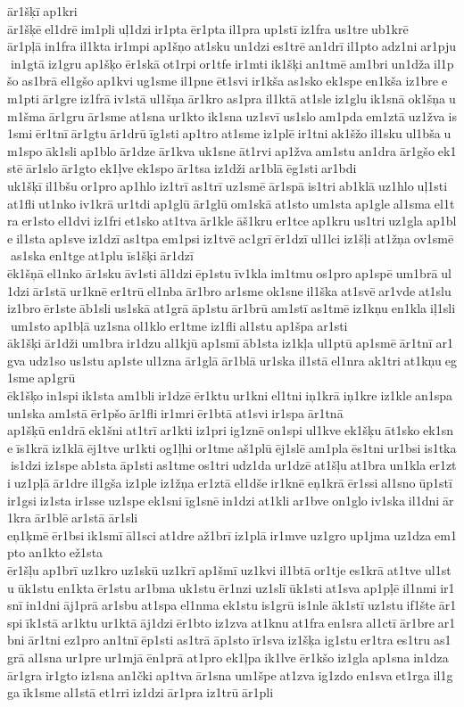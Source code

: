 ār1šķī ap1kri 
ār1šķē el1drē im1pli uļ1dzi ir1pta ēr1pta il1pra up1stī iz1fra us1tre ub1krē 	ār1pļā in1fra il1kta ir1mpi ap1šņo at1sku un1dzi es1trē an1drī il1pto adz1ni ar1pju in1gtā iz1gru ap1šķo ēr1skā ot1rpi or1tfe ir1mti ik1šķi an1tmē am1bri un1dža il1pšo as1brā el1gšo ap1kvi ug1sme il1pne ēt1svi ir1kša as1sko ek1spe en1kša iz1bre em1pti ār1gre iz1frā iv1stā ul1šņa ār1kro as1pra il1ktā at1sle iz1glu ik1snā ok1šņa um1šma ār1gru ār1sme at1sna ur1kto ik1sna uz1svī us1slo am1pda em1ztā uz1žva is1smi ēr1tnī ār1gtu ār1drū īg1sti ap1tro at1sme iz1plē ir1tni ak1šžo il1sku ul1bša um1spo āk1sli ap1blo ār1dze ār1kva uk1sne āt1rvi ap1žva am1stu an1dra ār1gšo ek1stē ār1slo ār1gto ek1ļve ek1spo ār1tsa iz1dži ar1blā ēg1sti ar1bdi 	uk1šķī il1bšu or1pro ap1hlo iz1trī as1trī uz1smē ār1spā is1tri ab1klā uz1hlo uļ1sti at1fli ut1nko iv1krā ur1tdi ap1glū ār1glū om1skā at1sto um1sta ap1gle al1sma el1tra er1sto el1dvi iz1fri et1sko at1tva ār1kle āš1kru er1tce ap1kru us1tri uz1gla ap1ble il1sta ap1sve iz1dzī as1tpa em1psi iz1tvē ac1grī ēr1dzī ul1lci iz1šļi at1žņa ov1smē as1ska en1tge at1plu 	īs1šķi ār1dzī 
ēk1šņā el1nko ār1sku āv1sti āl1dzi ēp1stu īv1kla im1tmu os1pro ap1spē um1brā ul1dzi ār1stā ur1knē er1trū el1nba ār1bro ar1sme ok1sne il1ška at1svē ar1vde at1slu iz1bro ēr1ste āb1sli us1skā at1grā āp1stu ār1brū am1stī as1tmē iz1kņu en1kla iļ1sli um1sto ap1bļā uz1sna ol1klo er1tme iz1fli al1stu ap1špa ar1sti 	āk1šķi ār1dži um1bra ir1dzu al1kjū ap1smī āb1sta iz1kļa ul1ptū ap1smē ār1tnī ar1gva udz1so us1stu ap1ste ul1zna ār1glā ār1blā ur1ska il1stā el1nra ak1tri at1kņu eg1sme ap1grū 	ēk1šķo in1spi ik1sta am1bli ir1dzē ēr1ktu ur1kni el1tni iņ1krā iņ1kre iz1kle an1spa un1ska am1stā ēr1pšo ār1fli ir1mri ēr1btā at1svi ir1spa ār1tnā 	ap1šķū en1drā ek1šni at1trī ar1kti iz1pri ig1znē on1spi ul1kve ek1šķu āt1sko ek1sne īs1krā iz1klā ēj1tve ur1kti og1ļhi or1tme aš1plū ēj1slē am1pla ēs1tni ur1bsi is1tka is1dzi iz1spe ab1sta āp1sti as1tme os1tri udz1da ur1dzē at1šļu at1bra un1kla er1zti uz1pļā ār1dre il1gša iz1ple iz1žņa er1ztā el1dše ir1knē eņ1krā ēr1ssi al1sno ūp1stī ir1gsi iz1sta ir1sse uz1spe ek1sni īg1snē in1dzi at1kli ar1bve on1glo iv1ska il1dni ār1kra ār1blē ar1stā ār1sli 	eņ1ķmē ēr1bsi ik1smī āl1sci at1dre až1brī iz1plā ir1mve uz1gro up1jma uz1dza em1pto an1kto ež1sta 	ēr1šļu ap1brī uz1kro uz1skū uz1krī ap1šmī uz1kvi il1btā or1tje es1krā at1tve ul1stu ūk1stu en1kta ēr1stu ar1bma uk1stu ēr1nzi uz1slī ūk1sti at1sva ap1pļē il1nmi ir1snī in1dni āj1prā ar1sbu at1spa el1nma ek1stu is1grū is1nle āk1stī uz1stu if1šte ār1spi īk1stā ar1ktu ur1ktā āj1dzi ēr1bto iz1zva at1knu at1fra en1sra al1ctī ār1bre ar1bni ār1tni ez1pro an1tnī ēp1sti as1trā āp1sto īr1sva iz1šķa ig1stu er1tra es1tru as1grā al1sna ur1pre ur1mjā ēn1prā at1pro ek1ļpa ik1lve ēr1kšo iz1gla ap1sna in1dza ār1gra ir1gto iz1sna an1čki ap1tva ār1sna um1špe at1zva ig1zdo en1sva et1rga il1gga īk1sme al1stā et1rri iz1dzi ār1pra iz1trū ār1pli 

